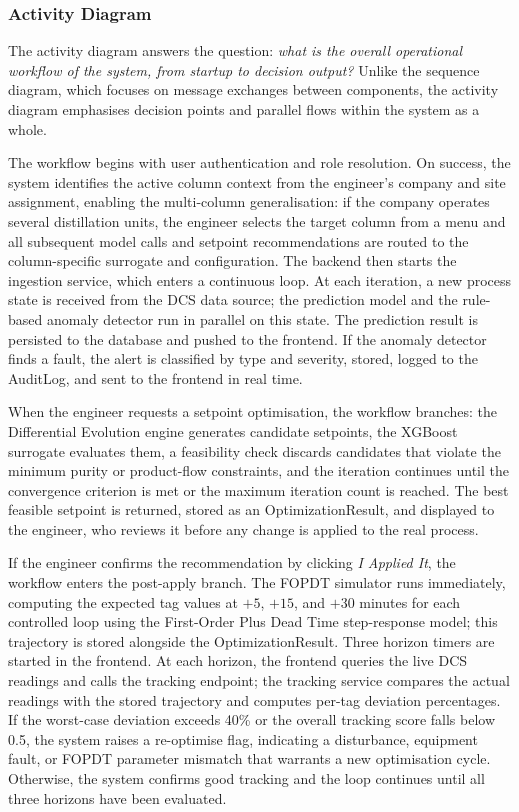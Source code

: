 \subsubsection{Activity Diagram}

The activity diagram answers the question: \textit{what is the
overall operational workflow of the system, from startup to decision
output?}  Unlike the sequence diagram, which focuses on message
exchanges between components, the activity diagram emphasises
decision points and parallel flows within the system as a whole.

The workflow begins with user authentication and role resolution.  On
success, the system identifies the active column context from the
engineer's company and site assignment, enabling the multi-column
generalisation: if the company operates several distillation units,
the engineer selects the target column from a menu and all
subsequent model calls and setpoint recommendations are routed to
the column-specific surrogate and configuration.  The backend then
starts the ingestion service, which enters a continuous loop.  At
each iteration, a new process state is received from the DCS data
source; the prediction model and the rule-based anomaly detector run
in parallel on this state.  The prediction result is persisted to
the database and pushed to the frontend.  If the anomaly detector
finds a fault, the alert is classified by type and severity, stored,
logged to the AuditLog, and sent to the frontend in real time.

When the engineer requests a setpoint optimisation, the workflow
branches: the Differential Evolution engine generates candidate
setpoints, the XGBoost surrogate evaluates them, a feasibility check
discards candidates that violate the minimum purity or product-flow
constraints, and the iteration continues until the convergence
criterion is met or the maximum iteration count is reached.  The
best feasible setpoint is returned, stored as an OptimizationResult,
and displayed to the engineer, who reviews it before any change is
applied to the real process.

If the engineer confirms the recommendation by clicking \textit{I
Applied It}, the workflow enters the post-apply branch.  The FOPDT
simulator runs immediately, computing the expected tag values at
$+5$, $+15$, and $+30$ minutes for each controlled loop using the
First-Order Plus Dead Time step-response model; this trajectory is
stored alongside the OptimizationResult.  Three horizon timers are
started in the frontend.  At each horizon, the frontend queries the
live DCS readings and calls the tracking endpoint; the tracking
service compares the actual readings with the stored trajectory and
computes per-tag deviation percentages.  If the worst-case deviation
exceeds 40\% or the overall tracking score falls below 0.5, the
system raises a re-optimise flag, indicating a disturbance,
equipment fault, or FOPDT parameter mismatch that warrants a new
optimisation cycle.  Otherwise, the system confirms good tracking
and the loop continues until all three horizons have been evaluated.

